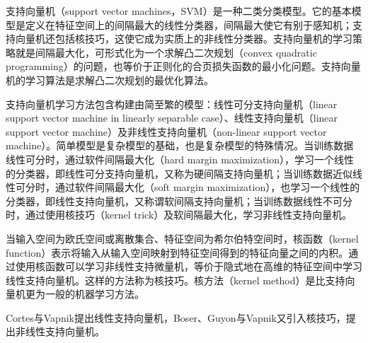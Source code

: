 支持向量机（support vector machines，SVM）是一种二类分类模型。它的基本模型是定义在特征空间上的间隔最大的线性分类器，间隔最大使它有别于感知机；支持向量机还包括核技巧，这使它成为实质上的非线性分类器。支持向量机的学习策略就是间隔最大化，可形式化为一个求解凸二次规划（convex quadratic programming）的问题，也等价于正则化的合页损失函数的最小化问题。支持向量机的学习算法是求解凸二次规划的最优化算法。
 
支持向量机学习方法包含构建由简至繁的模型：线性可分支持向量机（linear support vector machine in linearly separable case）、线性支持向量机（linear support vector machine）及非线性支持向量机（non-linear support vector machine）。简单模型是复杂模型的基础，也是复杂模型的特殊情况。当训练数据线性可分时，通过软件间隔最大化（hard margin maximization），学习一个线性的分类器，即线性可分支持向量机，又称为硬间隔支持向量机；当训练数据近似线性可分时，通过软件间隔最大化（soft margin maximization），也学习一个线性的分类器，即线性支持向量机，又称谓软间隔支持向量机；当训练数据线性不可分时，通过使用核技巧（kernel trick）及软间隔最大化，学习非线性支持向量机。 

当输入空间为欧氏空间或离散集合、特征空间为希尔伯特空间时，核函数（kernel function）表示将输入从输入空间映射到特征空间得到的特征向量之间的内积。通过使用核函数可以学习非线性支持微量机，等价于隐式地在高维的特征空间中学习线性支持向量机。这样的方法称为核技巧。核方法（kernel method）是比支持向量机更为一般的机器学习方法。 

Cortes与Vapnik提出线性支持向量机，Boser、Guyon与Vapnik又引入核技巧，提出非线性支持向量机。